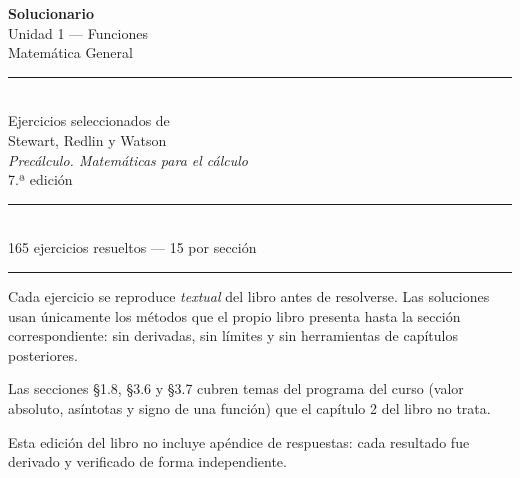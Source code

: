 \documentclass[11pt]{article}
\begin{document}
\begin{titlepage}
\thispagestyle{empty}
\centering
\vspace*{4.5cm}

{\Huge\bfseries Solucionario}\\[0.6em]
{\LARGE Unidad 1 --- Funciones}\\[2.2cm]

{\large Matemática General}\\[3.5cm]

\rule{0.55\textwidth}{0.4pt}\\[1em]
{\large Ejercicios seleccionados de}\\[0.4em]
{\large Stewart, Redlin y Watson}\\[0.3em]
{\large\itshape Precálculo. Matemáticas para el cálculo}\\[0.3em]
{\large 7.ª edición}\\[1em]
\rule{0.55\textwidth}{0.4pt}\\[2.5cm]

{\large 165 ejercicios resueltos --- 15 por sección}

\vfill
\end{titlepage}

\clearpage
{}
\setcounter{page}{1}

\tableofcontents

\vspace{2em}
\noindent\rule{\textwidth}{0.4pt}
\vspace{0.8em}

\small
\noindent Cada ejercicio se reproduce \emph{textual} del libro antes de resolverse. Las soluciones
usan únicamente los métodos que el propio libro presenta hasta la sección correspondiente:
sin derivadas, sin límites y sin herramientas de capítulos posteriores.

\medskip
Las secciones §1.8, §3.6 y §3.7 cubren temas del programa del curso (valor absoluto,
asíntotas y signo de una función) que el capítulo 2 del libro no trata.

\medskip
Esta edición del libro no incluye apéndice de respuestas: cada resultado fue derivado
y verificado de forma independiente.
\normalsize

\clearpage
{}
\setcounter{page}{1}
\end{document}
